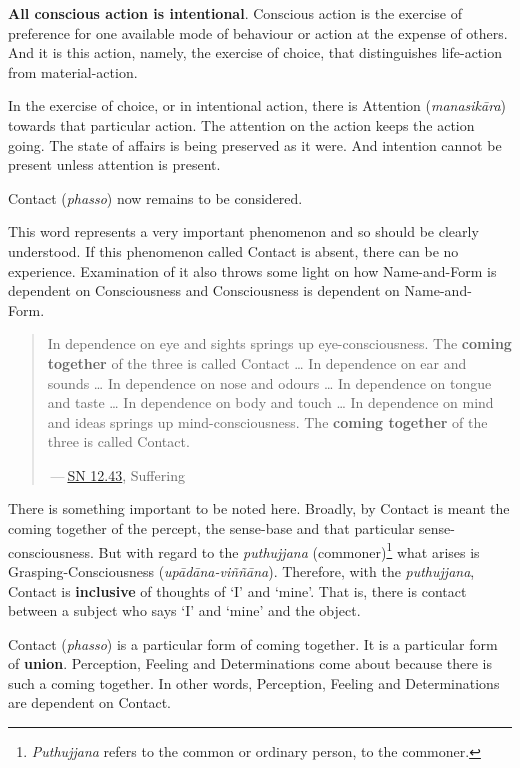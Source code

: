 \textbf{All conscious action is intentional}. Conscious action is the exercise of preference for one available mode of behaviour or action at the expense of others. And it is this action, namely, the exercise of choice, that distinguishes life-action from material-action.

In the exercise of choice, or in intentional action, there is Attention (\emph{manasikāra}) towards that particular action. The attention on the action keeps the action going. The state of affairs is being preserved as it were. And intention cannot be present unless attention is present.

Contact (\emph{phasso}) now remains to be considered.

This word represents a very important phenomenon and so should be clearly understood. If this phenomenon called Contact is absent, there can be no experience. Examination of it also throws some light on how Name-and-Form is dependent on Consciousness and Consciousness is dependent on Name-and- Form.

\begin{quote}
In dependence on eye and sights springs up eye-consciousness. The \textbf{coming together} of the three is called Contact \ldots{} In dependence on ear and sounds \ldots{} In dependence on nose and odours \ldots{} In dependence on tongue and taste \ldots{} In dependence on body and touch \ldots{} In dependence on mind and ideas springs up mind-consciousness. The \textbf{coming together} of the three is called Contact.

 --- \href{https://suttacentral.net/sn12.43/en/bodhi}{SN 12.43}, Suffering
\end{quote}

There is something important to be noted here. Broadly, by Contact is meant the coming together of the percept, the sense-base and that particular sense-consciousness. But with regard to the \emph{puthujjana} (commoner)\footnote{\emph{Puthujjana} refers to the common or ordinary person, to the commoner.} what arises is Grasping-Consciousness (\emph{upādāna-viññāna}). Therefore, with the \emph{puthujjana}, Contact is \textbf{inclusive} of thoughts of `I' and `mine'. That is, there is contact between a subject who says `I' and `mine' and the object.

Contact (\emph{phasso}) is a particular form of coming together. It is a particular form of \textbf{union}. Perception, Feeling and Determinations come about because there is such a coming together. In other words, Perception, Feeling and Determinations are dependent on Contact.


